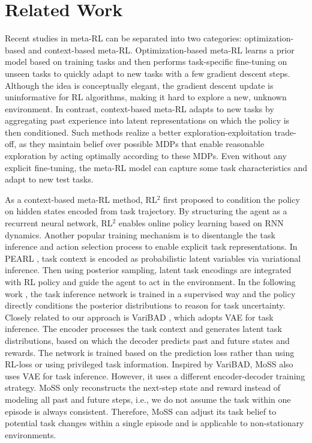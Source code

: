 \documentclass[letterpaper]{article} %
\begin{document}
\section{Related Work}
Recent studies in meta-RL can be separated into two categories: optimization-based and context-based meta-RL. Optimization-based meta-RL \cite{MAML, E-MAML, Reptile, ProMP} learns a prior model based on training tasks and then performs task-specific fine-tuning on unseen tasks to quickly adapt to new tasks with a few gradient descent steps. Although the idea is conceptually elegant, the gradient descent update is uninformative for RL algorithms, making it hard to explore a new, unknown environment. In contrast, context-based meta-RL \cite{RL2, PEARL, MQL, asTaskInference, VariBAD, MCAT, David, bing2021meta, Alex, Xiangtong} adapts to new tasks by aggregating past experience into latent representations on which the policy is then conditioned. Such methods realize a better exploration-exploitation trade-off, as they maintain belief over possible MDPs that enable reasonable exploration by acting optimally according to these MDPs. Even without any explicit fine-tuning, the meta-RL model can capture some task characteristics and adapt to new test tasks.



As a context-based meta-RL method, RL$^{2}$ \cite{RL2} first proposed to condition the policy on hidden states encoded from task trajectory. By structuring the agent as a recurrent neural network, RL$^{2}$ enables online policy learning based on RNN dynamics. Another popular training mechanism is to disentangle the task inference and action selection process to enable explicit task representations. In PEARL \cite{PEARL}, task context is encoded as probabilistic latent variables via variational inference. Then using posterior sampling, latent task encodings are integrated with RL policy and guide the agent to act in the environment. In the following work \cite{asTaskInference}, the task inference network is trained in a supervised way and the policy directly conditions the posterior distributions to reason for task uncertainty. Closely related to our approach is VariBAD \cite{VariBAD}, which adopts VAE for task inference. The encoder processes the task context and generates latent task distributions, based on which the decoder predicts past and future states and rewards. The network is trained based on the prediction loss rather than using RL-loss \cite{PEARL} or using privileged task information\cite{asTaskInference}. Inspired by VariBAD, MoSS also uses VAE for task inference. However, it uses a different encoder-decoder training strategy. MoSS only reconstructs the next-step state and reward instead of modeling all past and future steps, i.e., we do not assume the task within one episode is always consistent. Therefore, MoSS can adjust its task belief to potential task changes within a single episode and is applicable to non-stationary environments. 
\end{document}
